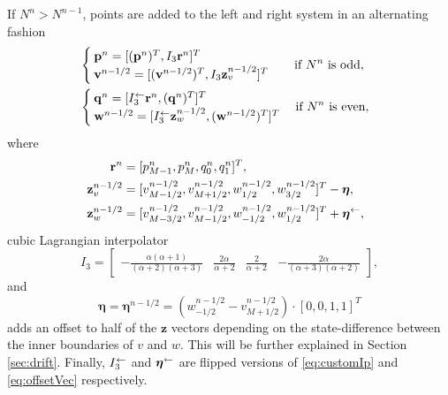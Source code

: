 If $N^n>N^{n-1}$, points are added to the left and right system in an alternating fashion 
\begin{equation}\label{eq:addingPoint}
    \begin{aligned}
        \!\!\!\!\!&\begin{cases}
            \mathbf{p}^n = [(\mathbf{p}^n)^T, I_3\mathbf{r}^n]^T\\
            \mathbf{v}^{n-1/2} = [(\mathbf{v}^{n-1/2})^T, I_3\mathbf{z}_v^{n-1/2}]^T
        \end{cases}
        \quad\!\text{if $N^n $ is odd},\\
        \!\!\!\!\!&\begin{cases}
            \mathbf{q}^n = [I_3^\flip\mathbf{r}^n, (\mathbf{q}^n)^T]^T\\
            \mathbf{w}^{n-1/2} = [ I_3^\flip\mathbf{z}_w^{n-1/2},(\mathbf{w}^{n-1/2})^T]^T
        \end{cases}\text{if $ N^n$ is even},
    \end{aligned}
\end{equation}
where
\begin{equation}\label{eq:interpVecs}
    \begin{aligned}
        \!\!\!\!\mathbf{r}^n &= [p_{M-1}^n, p_M^n, q_0^n, q_1^n]^T,\\
        \!\!\!\!\mathbf{z}_v^{n-1/2} &= [v_{M-1/2}^{n-1/2}, v_{M+1/2}^{n-1/2}, w_{1/2}^{n-1/2}, w_{3/2}^{n-1/2}]^T - \boldsymbol{\eta},\\
        \!\!\!\!\mathbf{z}_w^{n-1/2} &= [v_{M-3/2}^{n-1/2}, v_{M-1/2}^{n-1/2}, w_{-1/2}^{n-1/2}, w_{1/2}^{n-1/2}]^T+ \boldsymbol{\eta}^{\flip},%
    \end{aligned}
\end{equation}
cubic Lagrangian interpolator
\begin{equation}\label{eq:customIp}
    I_3 = \begin{bmatrix} -\frac{\alpha(\alpha+1)}{(\alpha+2)(\alpha+3)} &\frac{2\alpha}{\alpha+2} &\frac{2}{\alpha+2} 
    &-\frac{2\alpha}{(\alpha+3)(\alpha+2)}
    \end{bmatrix},
\end{equation}
and 
\begin{equation}\label{eq:offsetVec}
    \boldsymbol{\eta} = \boldsymbol{\eta}^{n-1/2}= \left(w_{-1/2}^{n-1/2}-v_{M+1/2}^{n
    -1/2}\right)\cdot[0, 0, 1, 1]^T 
\end{equation}
adds an offset to half of the $\mathbf{z}$ vectors depending on the state-difference between the inner boundaries of $v$ and $w$. This will be further explained in Section \ref{sec:drift}. Finally, $I_3^\leftarrow$ and $\boldsymbol{\eta}^{\leftarrow}$ are flipped versions of \eqref{eq:customIp} and \eqref{eq:offsetVec} respectively.

